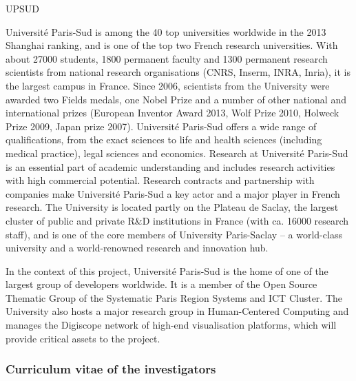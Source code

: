 \begin{sitedescription}{UPSUD} \label{desc:ParisSud}

Université Paris-Sud is among the 40 top universities worldwide in the
2013 Shanghai ranking, and is one of the top two French research
universities. With about 27000 students, 1800 permanent faculty
and 1300 permanent research scientists from national research
organisations (CNRS, Inserm, INRA, Inria), it is the largest campus in
France. Since 2006, scientists from the University were awarded two
Fields medals, one Nobel Prize and a number of other national and international prizes
(European Inventor Award 2013, Wolf Prize 2010, Holweck Prize 2009,
Japan prize 2007).  Université Paris-Sud offers a
wide range of qualifications, from the exact sciences to life and health
sciences (including medical practice), legal sciences and economics. 
Research at Université Paris-Sud is an essential part of academic understanding 
and includes research activities with high commercial potential. 
Research contracts and partnership with companies make
Université Paris-Sud a key actor and a major player in French
research.  The University is located partly on the Plateau de Saclay,
the largest cluster of public and private R\&D institutions in France
(with ca. 16000 research staff), and is one of the core members of 
University Paris-Saclay – a world-class university and a
world-renowned research and innovation hub.

In the context of this project, Université Paris-Sud is the
home of one of the largest group of \Sage developers worldwide.
It is a member of the Open Source Thematic Group of the Systematic
Paris Region Systems and ICT Cluster. 
The University also hosts a major research group in Human-Centered Computing
and manages the Digiscope network of high-end visualisation platforms,
which will provide critical assets to the project.


\subsubsection*{Curriculum vitae of the investigators}

% 
% 
% 
% 
% 


\end{sitedescription}
